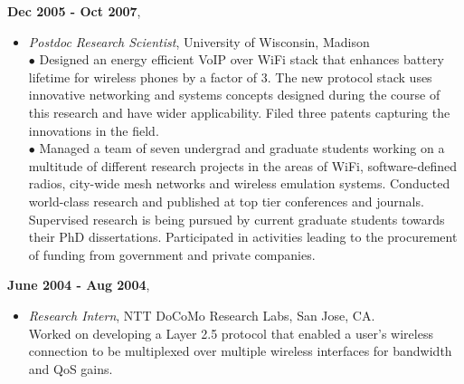 \begin{resume}
\begin{itemize}
    \end{itemize}

{\bf Dec 2005 - Oct 2007},
    \begin{itemize}
         \item[] {\it Postdoc Research Scientist}, University of Wisconsin, Madison\\
	        $\bullet$ Designed an energy efficient VoIP over WiFi stack that
		enhances battery lifetime for wireless phones by a factor of 3.
		The new protocol stack uses innovative networking and systems
		concepts designed during the course of this research and have
		wider applicability. Filed three patents capturing the
		innovations in the field.\\
                $\bullet$ Managed a team of seven undergrad and graduate students working on a multitude of different research
projects  in the areas of WiFi, software-defined radios, city-wide mesh
networks and wireless emulation systems. Conducted world-class research and
published at top tier conferences and journals. Supervised research is being
pursued by current graduate students towards their PhD dissertations. Participated in activities
leading to the procurement of funding from government and private companies.
    \end{itemize}

 {\bf June 2004 - Aug 2004},   	
    \begin{itemize}
         \item[] {\it Research Intern},  NTT DoCoMo Research Labs, San Jose, CA.\\
		 Worked on developing a Layer 2.5 protocol that enabled a user's wireless connection to be
                 multiplexed over multiple wireless interfaces for bandwidth and QoS gains.
		 

   \end{itemize}


\end{resume}

